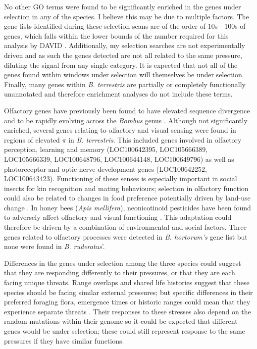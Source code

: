 \documentclass[12pt]{article}
\begin{document}
\begin{linenumbers}
    	
    No other GO terms were found to be significantly enriched in the genes under selection in any of the species. I believe this may be due to multiple factors. The gene lists identified during these selection scans are of the order of 10s - 100s of genes, which falls within the lower bounds of the number required for this analysis by DAVID \citep{huang_systematic_2009}.
    Additionally, my selection searches are not experimentally driven and as such the genes detected are not all related to the same pressure, diluting the signal from any single category. It is expected that not all of the genes found within windows under selection will themselves be under selection. Finally, many genes within \emph{B. terrestris} are partially or completely functionally unannotated and therefore enrichment analyses do not include these terms. 
    	
    	
    Olfactory genes have previously been found to have elevated sequence divergence and to be rapidly evolving across the \emph{Bombus} genus \citep{sun_genus-wide_2021}. Although not significantly enriched, several genes relating to olfactory and visual sensing were found in regions of elevated $\pi$ in \emph{B. terrestris}. 
    This included genes involved in olfactory perception, learning and memory (LOC100642395, LOC105666389, LOC105666339, LOC100648796, LOC100644148, LOC100649796) as well as photoreceptor and optic nerve development genes (LOC100642252, LOC100643423). 
    Functioning of these senses is especially important in social insects for kin recognition and mating behaviours; selection in olfactory function could also be related to changes in food preference potentially driven by land-use change \citep{ayasse_mating_2001, sun_genus-wide_2021}. In honey bees (\emph{Apis mellifera}), neonicotinoid pesticides have been found to adversely affect olfactory and visual functioning \citep{roat_using_2020}.
    This adaptation could therefore be driven by a combination of environmental and social factors. 
    Three genes related to olfactory processes were detected in \emph{B. hortorum's} gene list but none were found in \emph{B. ruderatus}'.
    	
    	
    Differences in the genes under selection among the three species could suggest that they are responding differently to their pressures, or that they are each facing unique threats. Range overlaps and shared life histories suggest that these species should be facing similar external pressures; but specific differences in their preferred foraging flora, emergence times or historic ranges could mean that they experience separate threats \citep{powney_widespread_2019}. Their responses to these stresses also depend on the random mutations within their genome so it could be expected that different genes would be under selection; these could still represent response to the same pressures if they have similar functions.
    	

\end{linenumbers}
\end{document}
